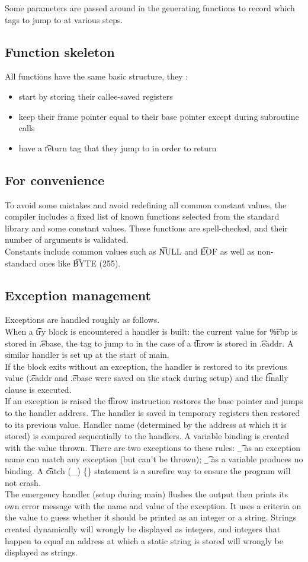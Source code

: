 Some parameters are passed around in the generating functions to record which tags to jump to at various steps.

\subsection{Function skeleton}
All functions have the same basic structure, they :
\begin{itemize}
    \item start by storing their callee-saved registers
    \item keep their frame pointer equal to their base pointer except during subroutine calls
    \item have a \t{return} tag that they jump to in order to return
\end{itemize}

\subsection{For convenience}
To avoid some mistakes and avoid redefining all common constant values, the compiler includes a fixed list of known functions selected from the standard library and some constant values. These functions are spell-checked, and their number of arguments is validated.\\
Constants include common values such as \t{NULL} and \t{EOF} as well as non-standard ones like \t{BYTE} (255).

\subsection{Exception management}
Exceptions are handled roughly as follows.\\
When a \t{try} block is encountered a handler is built: the current value for \t{\%rbp} is stored in \t{.ebase}, the tag to jump to in the case of a \t{throw} is stored in \t{.eaddr}. A similar handler is set up at the start of main.\\
If the block exits without an exception, the handler is restored to its previous value (\t{.eaddr} and \t{.ebase} were saved on the stack during setup) and the \t{finally} clause is executed.\\
If an exception is raised the \t{throw} instruction restores the base pointer and jumps to the handler address. The handler is saved in temporary registers then restored to its previous value. Handler name (determined by the address at which it is stored) is compared sequentially to the handlers. A variable binding is created with the value thrown. There are two exceptions to these rules: \t{\_} as an exception name can match any exception (but can't be thrown); \t{\_} as a variable produces no binding. A \t{catch (\_) \{\}} statement is a surefire way to ensure the program will not crash.\\
The emergency handler (setup during main) flushes the output then prints its own error message with the name and value of the exception. It uses a criteria on the value to guess whether it should be printed as an integer or a string. Strings created dynamically will wrongly be displayed as integers, and integers that happen to equal an address at which a static string is stored will wrongly be displayed as strings.
